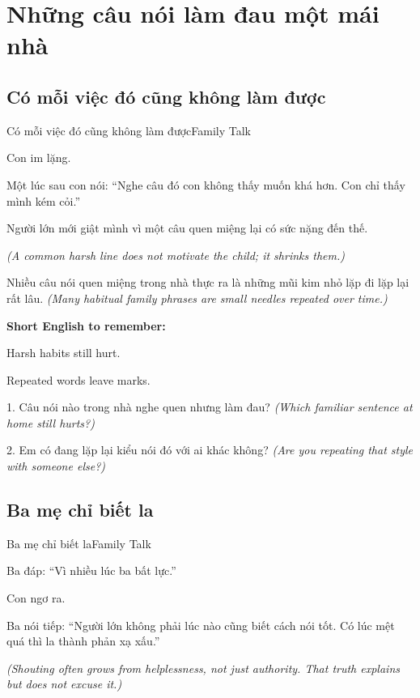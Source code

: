 \chapter{Những câu nói làm đau một mái nhà}

\section{Có mỗi việc đó cũng không làm được}
\begin{truyen}{Có mỗi việc đó cũng không làm được}{Family Talk}

Con im lặng.

Một lúc sau con nói: ``Nghe câu đó con không thấy muốn khá hơn. Con chỉ thấy mình kém cỏi.''

Người lớn mới giật mình vì một câu quen miệng lại có sức nặng đến thế.

\textit{(A common harsh line does not motivate the child; it shrinks them.)}
\end{truyen}

\begin{baihoc}
Nhiều câu nói quen miệng trong nhà thực ra là những mũi kim nhỏ lặp đi lặp lại rất lâu.
\textit{(Many habitual family phrases are small needles repeated over time.)}
\end{baihoc}

\begin{ghinhoanh}
\textbf{Short English to remember:}

Harsh habits still hurt.

Repeated words leave marks.
\end{ghinhoanh}

\begin{tuhocnhanh}
1. Câu nói nào trong nhà nghe quen nhưng làm đau? \textit{(Which familiar sentence at home still hurts?)}

2. Em có đang lặp lại kiểu nói đó với ai khác không? \textit{(Are you repeating that style with someone else?)}
\end{tuhocnhanh}
\ngancach

\section{Ba mẹ chỉ biết la}
\begin{truyen}{Ba mẹ chỉ biết la}{Family Talk}

Ba đáp: ``Vì nhiều lúc ba bất lực.''

Con ngơ ra.

Ba nói tiếp: ``Người lớn không phải lúc nào cũng biết cách nói tốt. Có lúc mệt quá thì la thành phản xạ xấu.''

\textit{(Shouting often grows from helplessness, not just authority. That truth explains but does not excuse it.)}
\end{truyen}

